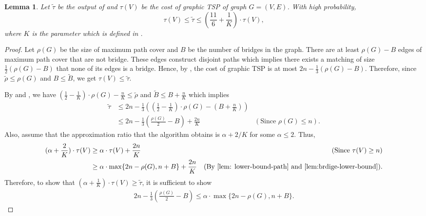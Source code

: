 \documentclass[letterpaper,11pt]{article}
\newcommand{\tspsize}[1]{\ensuremath{\tau}(#1)}
\newcommand{\algtwo}[0]{\Cref{alg:path-cover22}}
\newtheorem{lemma}[theorem]{Lemma}
\newenvironment{myproof}{
\vspace{-0.5cm}
\begin{proof}
}{
\end{proof}
}
\begin{document}
\begin{lemma}\label{lem: graphic-tsp-approx2}
Let $\tilde{\tau}$ be the output of  and $\tspsize{V}$ be the cost of graphic TSP of graph $G = (V, E)$. With high probability,
$$
\tspsize{V} \leq \tilde{\tau} \leq (\frac{11}{6} + \frac{1}{K}) \cdot \tspsize{V},
$$
where $K$ is the parameter which is defined in \algtwo{}.
\end{lemma}
\begin{myproof}
Let $\rho(G)$ be the size of maximum path cover and $B$ be the number of bridges in the graph. There are at least $\rho(G) - B$ edges of maximum path cover that are not bridge. These edges construct disjoint paths which implies there exists a matching of size $\frac{1}{2}(\rho(G) - B)$ that none of its edges is a bridge. Hence, by , the cost of graphic TSP is at most $2n - \frac{1}{3}(\rho(G) - B)$. Therefore, since $\tilde{\rho} \leq \rho(G)$ and $B \leq \tilde{B}$, we get $\tspsize{V} \leq \tilde{\tau}$.

By  and , we have $\left(\frac{1}{2} - \frac{1}{K} \right)\cdot\rho(G) - \frac{n}{K}\leq \tilde{\rho}$ and $\tilde{B} \leq B + \frac{n}{K}$ which implies
\begin{align*}
    \tilde{\tau} & \leq 2n - \frac{1}{3}\left( (\frac{1}{2} - \frac{1}{K})\cdot\rho(G) - (B + \frac{n}{K}) \right) \\
    & \leq 2n - \frac{1}{3}(\frac{\rho(G)}{2} - B) + \frac{2n}{K} & (\text{Since } \rho(G) \leq n).
\end{align*}
Also, assume that the approximation ratio that the algorithm obtains is $\alpha + 2/K$ for some $\alpha \leq 2$. Thus,
\begin{align*}
    (\alpha + \frac{2}{K}) \cdot \tspsize{V} & \geq \alpha \cdot \tspsize{V} + \frac{2n}{K} & (\text{Since } \tspsize{V} \geq n) \\ 
    & \geq \alpha\cdot \max\{2n - \rho(G), n + B\} + \frac{2n}{K} & (\text{By \Cref{lem: lower-bound-path}  and  \Cref{lem:brdige-lower-bound}}).
\end{align*}
Therefore, to show that $(\alpha + \frac{1}{K})\cdot\tspsize{V} \geq \tilde{\tau}$, it is sufficient to show 
\begin{align*}
    2n - \frac{1}{3}(\frac{\rho(G)}{2} - B) \leq \alpha\cdot \max\{2n - \rho(G), n + B\}.
\end{align*}


\end{myproof}
\end{document}
